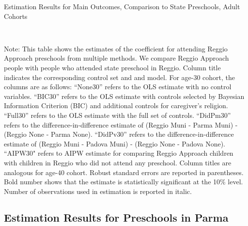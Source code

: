 \begin{table}[H] \caption{Estimation Results for Main Outcomes, Comparison to State Preschools, Adult Cohorts} \label{ols-M-adult-reg-stat}
\scalebox{0.75}{}
\vspace{1ex} \\
\footnotesize\raggedright{Note: This table shows the estimates of the coefficient for attending Reggio Approach preschools from multiple methods. We compare Reggio Approach people with people who attended state preschool in Reggio. Column title indicates the corresponding control set and and model. For age-30 cohort, the columns are as follows: ``None30'' refers to the OLS estimate with no control variables. ``BIC30'' refers to the OLS estimate with controls selected by Bayesian Information Criterion (BIC) and additional controls for caregiver's religion. ``Full30'' refers to the OLS estimate with the full set of controls. ``DidPm30'' refers to the difference-in-difference estimate of (Reggio Muni - Parma Muni) - (Reggio None - Parma None). ``DidPv30'' refers to the difference-in-difference estimate of (Reggio Muni - Padova Muni) - (Reggio None - Padova None).  ``AIPW30" refers to AIPW estimate for comparing Reggio Approach children with children in Reggio who did not attend any preschool. Column titles are analogous for age-40 cohort. Robust standard errors are reported in parentheses. Bold number shows that the estimate is statistically significant at the 10\% level. Number of observations used in estimation is reported in italic.}
\end{table}











\subsection{Estimation Results for Preschools in Parma}



